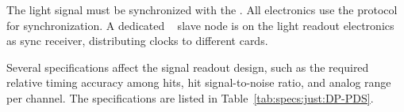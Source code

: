 The light signal must be synchronized with the . All  electronics use the  protocol for synchronization. A dedicated  ~\cite{utca} slave node is on the light readout  electronics as sync receiver, distributing clocks to different  cards.

Several  specifications affect the signal readout design, such as the required relative timing accuracy among hits, hit signal-to-noise ratio, and analog range per channel. The  specifications are listed in Table~\ref{tab:specs:just:DP-PDS}. 
